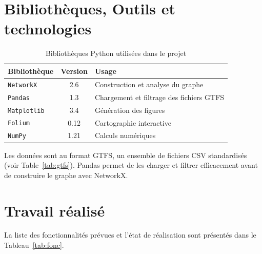 \documentclass[a4paper, 12pt, twoside]{article}
\begin{document}
\section{Bibliothèques, Outils et technologies}

\begin{table}[h]
\begin{center}
\begin{tabular}{|l|c|l|}
\hline
\textbf{Bibliothèque} & \textbf{Version} & \textbf{Usage} \\
\hline
\texttt{NetworkX}   & 2.6  & Construction et analyse du graphe \\
\texttt{Pandas}     & 1.3  & Chargement et filtrage des fichiers GTFS \\
\texttt{Matplotlib} & 3.4  & Génération des figures \\
\texttt{Folium}     & 0.12 & Cartographie interactive \\
\texttt{NumPy}      & 1.21 & Calculs numériques \\
\hline
\end{tabular}
\end{center}
\caption{Bibliothèques Python utilisées dans le projet}
\label{tab:libs}
\end{table}

Les données sont au format GTFS, un ensemble de fichiers CSV standardisés (voir Table~\ref{tab:gtfs}). Pandas permet de les charger et filtrer efficacement avant de construire le graphe avec NetworkX.

\section{Travail réalisé}

La liste des fonctionnalités prévues et l'état de réalisation sont présentés dans le Tableau~\ref{tab:fonc}.
\end{document}
